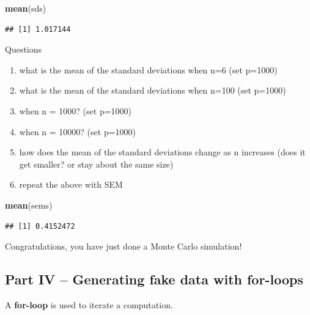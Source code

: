 \documentclass[]{book}
\newenvironment{Shaded}{\begin{snugshade}}{\end{snugshade}}
\newcommand{\KeywordTok}[1]{\textcolor[rgb]{0.13,0.29,0.53}{\textbf{#1}}}
\newcommand{\NormalTok}[1]{#1}
\providecommand{\tightlist}{%
  \setlength{\itemsep}{0pt}\setlength{\parskip}{0pt}}
\begin{document}
\begin{Shaded}
\begin{Highlighting}[]
\KeywordTok{mean}\NormalTok{(sds)}
\end{Highlighting}
\end{Shaded}

\begin{verbatim}
## [1] 1.017144
\end{verbatim}

Questions

\begin{enumerate}
\def\labelenumi{\arabic{enumi}.}
\tightlist
\item
  what is the mean of the standard deviations when n=6 (set p=1000)
\item
  what is the mean of the standard deviations when n=100 (set p=1000)
\item
  when n = 1000? (set p=1000)
\item
  when n = 10000? (set p=1000)
\item
  how does the mean of the standard deviations change as n increases (does it get smaller? or stay about the same size)
\item
  repeat the above with SEM
\end{enumerate}

\begin{Shaded}
\begin{Highlighting}[]
\KeywordTok{mean}\NormalTok{(sems)}
\end{Highlighting}
\end{Shaded}

\begin{verbatim}
## [1] 0.4152472
\end{verbatim}

Congratulations, you have just done a Monte Carlo simulation!

\hypertarget{part-iv-generating-fake-data-with-for-loops}{%
\subsection{Part IV -- Generating fake data with for-loops}\label{part-iv-generating-fake-data-with-for-loops}}

A \textbf{for-loop} is used to iterate a computation.
\end{document}
